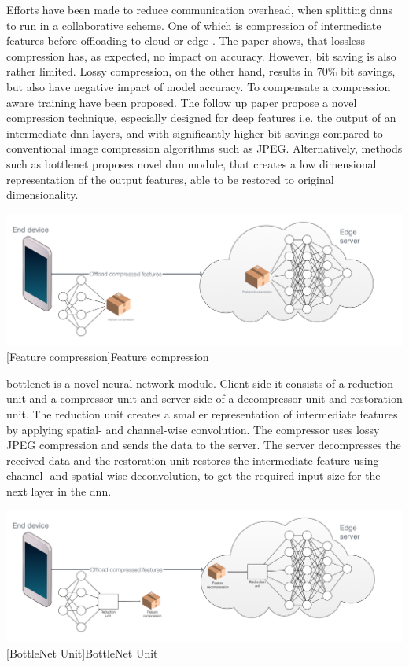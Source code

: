 \begin{enumdescript}
	Efforts have been made to reduce communication overhead, when splitting \gls{dnn}s to run in a collaborative scheme. One of which is compression of intermediate features before offloading to cloud or edge \cite{choi_deep_2018}. The paper shows, that lossless compression has, as expected, no impact on accuracy. However, bit saving is also rather limited. Lossy compression, on the other hand, results in 70\% bit savings, but also have negative impact of model accuracy. To compensate a compression aware training have been proposed. The follow up paper \cite{choi_near-lossless_2018} propose a novel compression technique, especially designed for deep features i.e. the output of an intermediate \gls{dnn} layers, and with significantly higher bit savings compared to conventional image compression algorithms such as JPEG. Alternatively, methods such as \gls{bottlenet} proposes novel \gls{dnn} module, that creates a low dimensional representation of the output features, able to be restored to original dimensionality. 
	
	
	\begin{minipage}[t]{\linewidth}    
		\centering
		\includegraphics[width=\linewidth]{figures/models/compressed}
		[Feature compression]{Feature compression}
	\end{minipage}
	
	\gls{bottlenet} \cite{eshratifar_bottlenet:_2019} is a novel neural network module. Client-side it consists of a reduction unit and a compressor unit and server-side of a decompressor unit and restoration unit. The reduction unit creates a smaller representation of intermediate features by applying spatial- and channel-wise convolution. The compressor uses lossy JPEG compression and sends the data to the server. The server decompresses the received data and the restoration unit restores the intermediate feature using channel- and spatial-wise deconvolution, to get the required input size for the next layer in the \gls{dnn}.
	
	\begin{minipage}[t]{\linewidth}
		\centering
		\includegraphics[width=\linewidth]{figures/models/bottlenet}
		[BottleNet Unit]{BottleNet Unit}
	\end{minipage}
	

\end{enumdescript}
